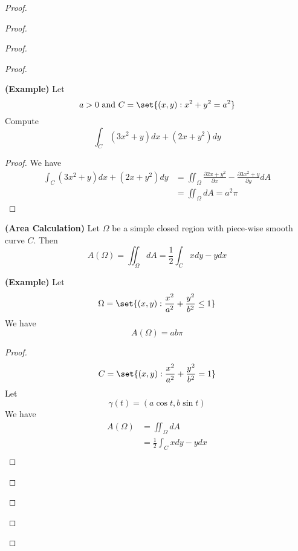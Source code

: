 \documentclass{report}
\begin{document}
\begin{proof}
\begin{proof}
\begin{proof}
\begin{proof}
\begin{theorem}
\label{9.3.8}
\textbf{(Example)} Let
\begin{equation}
a>0\text{ and }C=\set{(x,y):x^2+y^2=a^2}
\end{equation}
Compute
\begin{equation}
\int_C (3x^2+y)dx+(2x+y^2)dy
\end{equation}
\end{theorem}
\begin{proof}
We have
\begin{align}
\int_C (3x^2+y)dx+(2x+y^2)dy&=\iint_\Omega \frac{\partial 2x+y^2}{\partial x}-\frac{\partial 3x^2+y}{\partial y} dA\\
&=\iint_{\Omega} dA=a^2\pi
\end{align}
\end{proof}
\begin{theorem}
\label{9.3.9}
\textbf{(Area Calculation)} Let $\Omega$ be a simple closed region with piece-wise smooth curve $C$. Then
 \begin{equation}
A(\Omega)=\iint_{\Omega} dA=\frac{1}{2}\int_C xdy-ydx 
\end{equation}
\end{theorem}
\begin{theorem}
\label{9.3.10}
\textbf{(Example)} Let 
\begin{equation}
\Omega=\set{(x,y):\frac{x^2}{a^2}+\frac{y^2}{b^2}\leq 1}
\end{equation}
We have
\begin{equation}
A(\Omega)=ab\pi
\end{equation}
\end{theorem}
\begin{proof}
\begin{equation}
C=\set{(x,y):\frac{x^2}{a^2}+\frac{y^2}{b^2}=1}
\end{equation}
Let
\begin{equation}
\gamma (t)=(a\cos t,b\sin t)
\end{equation}
We have
\begin{align}
A(\Omega)&= \iint_{\Omega}dA\\
&=\frac{1}{2}\int_C xdy-ydx\\

\end{align}
\end{proof}
\end{proof}
\end{proof}
\end{proof}
\end{proof}
\end{document}

